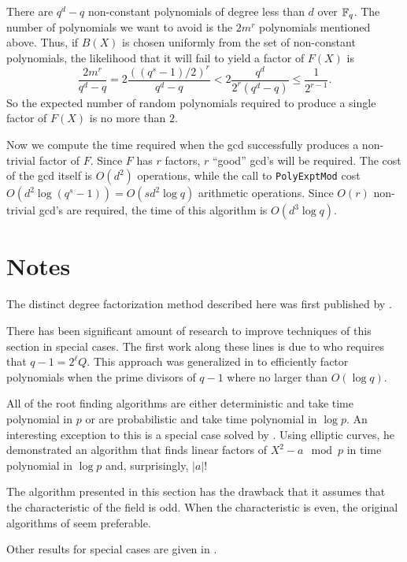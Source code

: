 There are $q^d - q$ non-constant polynomials of degree less than $d$
over $\mathbb{F}_q$.  The number of polynomials we want to avoid is the $2
m^r$ polynomials mentioned above.  Thus, if $B(X)$ is chosen uniformly
from the set of non-constant polynomials, the likelihood that it will
fail to yield a factor of $F(X)$ is
\[
\frac{2m^r}{q^d - q} = 2 \frac{((q^s-1)/2)^r}{q^d -q} 
  < 2 \frac{q^d}{2^r (q^d -q)} \le \frac{1}{2^{r-1}}.
\]
So the expected number of random polynomials required to produce a
single factor of $F(X)$ is no more than $2$.

Now we compute the time required when the {\sc gcd} successfully
produces a non-trivial factor of $F$.  Since $F$ has $r$ factors, $r$
``good'' {\sc gcd}'s will be required.  The cost of the {\sc gcd}
itself is $O(d^2)$ operations, while the call to {\tt PolyExptMod}
cost $O(d^2 \log (q^s - 1)) = O(s d^2 \log q)$ arithmetic operations.
Since $O(r)$ non-trivial {\sc gcd}'s are required, the time of
this algorithm is $O(d^3 \log q)$.

\section*{Notes}

\small

 The distinct degree factorization
method described here was first published by {\Arwin} \cite{Arwin1918-sv}.

  There has been significant amount of
research to improve techniques of this section in special cases.  The
first work along these lines is due to {\Moenck} \cite{Moenck1977-ed} who 
requires that $q-1 = 2^{\ell} Q$.  This approach was generalized in
\cite{Menezes1988-ec,Menezes1992-dz,Oorschot1989-qc} to efficiently factor
polynomials when the prime divisors of $q-1$ where no larger than
$O(\log q)$. 

All of the root finding algorithms are either deterministic and take
time polynomial in $p$ or are probabilistic and take time polynomial
in $\log p$.  An interesting exception to this is a special case
solved by {\Schoof} \cite{Schoof1985-nx}.  Using elliptic 
curves, he demonstrated an algorithm that finds 
linear factors of $X^2 - a \mod{p}$ in time polynomial in $\log p$ and, 
surprisingly, $|a|$!   

 The algorithm presented in this
section has the drawback that it assumes that the characteristic of
the field is odd.  When the characteristic is even, the original
algorithms of {\Berlekamp} \cite{Berlekamp1967-ej,Berlekamp1970-jw} seem
preferable.

Other results for special cases are given in
\cite{Huang1991-el,Huang1991-in,Ronyai1989-am,Niederreiter1993-hu,Niederreiter1993-od}. 


\normalsize
